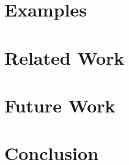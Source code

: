 \documentclass[paper=a4, fontsize=11pt]{scrartcl} %
\numberwithin{equation}{section} %
\numberwithin{figure}{section} %
\numberwithin{table}{section} %
\begin{document}

\section{Examples}


\section{Related Work}


\section{Future Work}

\section{Conclusion}
\end{document}
